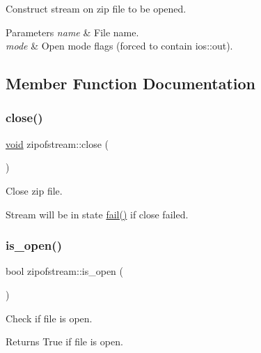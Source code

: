 Construct stream on zip file to be opened. 


\begin{DoxyParams}{Parameters}
{\em name} & File name. \\
\hline
{\em mode} & Open mode flags (forced to contain ios\+::out). \\
\hline
\end{DoxyParams}


\subsection{Member Function Documentation}
\mbox{\label{classzipofstream_ab9be37134f23d38fdcdaa136328fa1d7}} 
\subsubsection{\texorpdfstring{close()}{close()}}
{\footnotesize\ttfamily \hyperlink{lp__lib_8h_ac7828c7b2b31d2e11af17bdb6289c5d9}{void} zipofstream\+::close (\begin{DoxyParamCaption}{ }\end{DoxyParamCaption})}



Close zip file. 

Stream will be in state \hyperlink{_constraint_macros_8h_a73a3b169ac8c3419cbe15327e75ffcfd}{fail()} if close failed. \mbox{\label{classzipofstream_a1fbae1253cfada27c581b7813c272c6d}} 
\subsubsection{\texorpdfstring{is\+\_\+open()}{is\_open()}}
{\footnotesize\ttfamily bool zipofstream\+::is\+\_\+open (\begin{DoxyParamCaption}{ }\end{DoxyParamCaption})\hspace{0.3cm}{\ttfamily [inline]}}



Check if file is open. 

\begin{DoxyReturn}{Returns}
True if file is open. 
\end{DoxyReturn}
\mbox{\label{classzipofstream_a3545bccfc1fe8de52d1fd5d9f1139dd7}} 
